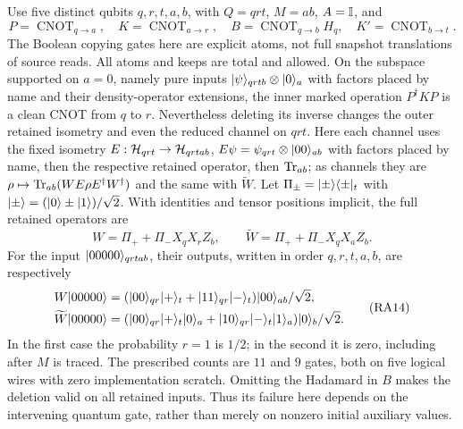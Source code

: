 \begin{counterexample}
\label{ex:resA-quantum}
Use five distinct qubits $q,r,t,a,b$, with $Q=qrt$, $M=ab$,
$A=\mathbb{I}$, and
\[
 P=\operatorname{CNOT}_{q\to a},\quad
 K=\operatorname{CNOT}_{a\to r},\quad
 B=\operatorname{CNOT}_{q\to b}H_q,\quad
 K'=\operatorname{CNOT}_{b\to t}.                     \tag{RA12}
\]
The Boolean copying gates here are explicit atoms, not full snapshot
translations of source reads. All atoms and keeps are total and allowed.
On the subspace supported on $a=0$, namely pure inputs
$\lvert \psi\rangle_{qrtb}\otimes\lvert 0\rangle_a$ with factors placed by name and
their density-operator extensions, the inner marked operation
$P^\dagger KP$ is a clean CNOT from $q$ to $r$.
Nevertheless deleting its
inverse changes the outer retained isometry and even the reduced channel
on $qrt$. Here each channel uses the fixed isometry
$E:\mathcal{H}_{qrt}\to\mathcal{H}_{qrtab}$,
$E\psi=\psi_{qrt}\otimes\lvert 00\rangle_{ab}$ with factors placed by name,
then the respective retained operator, then $\operatorname{Tr}_{ab}$; as channels
they are $\rho\mapsto\operatorname{Tr}_{ab}(WE\rho E^\dagger W^\dagger)$ and
the same with $\widetilde W$. Let $\Pi_\pm=\lvert \pm\rangle\langle \pm\rvert_t$ with
$\lvert \pm\rangle=(\lvert 0\rangle\pm\lvert 1\rangle)/\sqrt2$. With identities and tensor
positions implicit, the full retained operators are
\[
 W=\Pi_++\Pi_-X_qX_rZ_b,\qquad
 \widetilde W=\Pi_++\Pi_-X_qX_aZ_b.                  \tag{RA13}
\]
For the input $\lvert 00000\rangle_{qrtab}$, their outputs, written in order
$q,r,t,a,b$, are respectively
\[
 \begin{split}
 W\lvert 00000\rangle&=
 (\lvert 00\rangle_{qr}\lvert +\rangle_t+\lvert 11\rangle_{qr}\lvert -\rangle_t)
               \lvert 00\rangle_{ab}/\sqrt2,\\
 \widetilde W\lvert 00000\rangle&=
 (\lvert 00\rangle_{qr}\lvert +\rangle_t\lvert 0\rangle_a+
  \lvert 10\rangle_{qr}\lvert -\rangle_t\lvert 1\rangle_a)\lvert 0\rangle_b/\sqrt2.
 \end{split}                                        \tag{RA14}
\]
In the first case the probability $r=1$ is $1/2$; in the second it is
zero, including after $M$ is traced. The prescribed counts are $11$
and $9$ gates, both on five logical wires with zero implementation
scratch. Omitting the Hadamard in $B$ makes the deletion valid on all
retained inputs. Thus its failure here depends on the intervening
quantum gate, rather than merely on nonzero initial auxiliary values.
\end{counterexample}
